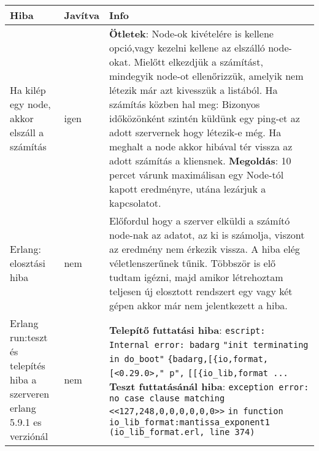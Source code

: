   	\begin{center}\begin{tabular}{| p{4cm} | p{1.5cm} | p{8cm} |}
	\hline Hiba & Javítva & Info 
    \\ \hline
        Ha kilép egy node, akkor elszáll a számítás 
      &
      	igen
      &
      \textbf{Ötletek}:
      Node-ok kivételére is kellene opció,vagy kezelni kellene az elszálló node-okat.
      \newline Mielőtt elkezdjük a számítást, mindegyik node-ot ellenőrizzük, amelyik nem létezik már azt kivesszük a listából. Ha számítás közben hal meg: Bizonyos időközönként szintén küldünk egy ping-et az adott szervernek hogy létezik-e még. Ha meghalt a node akkor hibával tér vissza az adott számítás a kliensnek.
      \newline \textbf{Megoldás}:
      10 percet várunk maximálisan egy Node-tól kapott eredményre, utána lezárjuk a kapcsolatot.
   	\\ \hline
    	Erlang: elosztási hiba
      &
      	nem
      &
      	Előfordul hogy a szerver elküldi a számító node-nak az adatot, az ki is számolja, viszont az eredmény nem érkezik vissza.\newline
      	A hiba elég véletlenszerűnek tűnik. Többször is elő tudtam igézni, majd amikor létrehoztam teljesen új elosztott rendszert egy vagy két gépen akkor már nem jelentkezett a hiba. 
    \\ \hline
    	Erlang run:teszt és telepítés hiba a szerveren erlang 5.9.1 es verziónál
      &
      	nem
      &
      	\textbf{Telepítő futtatási hiba}: \newline
      	\texttt{escript: Internal error: badarg}
		\texttt{"init terminating in do\_boot"}
        \texttt{\{badarg,[\{io,format,[<0.29.0>,"~p",}
        \texttt{[[\{io\_lib,format ... }
		\newline \textbf{Teszt futtatásánál hiba}: \newline
		\texttt{exception error: no case clause matching <<127,248,0,0,0,0,0,0>>}
     	\texttt{in function  io\_lib\_format:mantissa\_exponent\/1}
     	\texttt{(io\_lib\_format.erl, line 374) }
    \\ \hline
  	\end{tabular}\end{center}